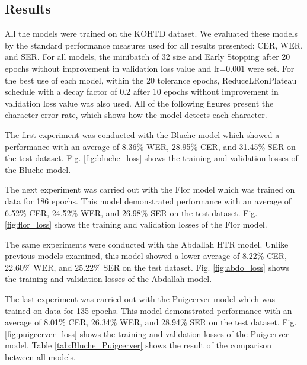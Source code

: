 \documentclass[preprint,12pt]{elsarticle}
\begin{document}
\subsection{Results}

All the models were trained on the KOHTD dataset. We evaluated these models by the standard performance measures used for all results presented: CER, WER, and SER. For all models, the minibatch of 32 size and Early Stopping after 20 epochs without improvement in validation loss value and lr=0.001 were set. For the best use of each model, within the 20 tolerance epochs, ReduceLRonPlateau schedule\cite{vinciarelli2001new} with a decay factor of 0.2 after 10 epochs without improvement in validation loss value was also used. All of the following figures present the character error rate, which shows how the model detects each character.

The first experiment was conducted with the Bluche model which showed a performance with an average of 8.36\% WER, 28.95\%  CER, and 31.45\% SER on the test dataset.  Fig. \ref{fig:bluche_loss} shows the training and validation losses of the Bluche model. 

The next experiment was carried out with the Flor model which was trained on data for 186 epochs. This model demonstrated performance with an average of 6.52\% CER, 24.52\%  WER, and 26.98\% SER on the test dataset. Fig. \ref{fig:flor_loss} shows the training and validation losses of the Flor model.

The same experiments were conducted with the Abdallah HTR model. Unlike previous models examined, this model showed a lower average of 8.22\% CER, 22.60\% WER, and 25.22\% SER on the test dataset. Fig. \ref{fig:abdo_loss} shows the training and validation losses of the Abdallah model.

The last experiment was carried out with the Puigcerver model which was trained on data for 135 epochs. This model demonstrated performance with an average of 8.01\% CER, 26.34\%  WER, and 28.94\% SER on the test dataset. Fig. \ref{fig:puigcerver_loss} shows the training and validation losses of the Puigcerver model. Table \ref{tab:Bluche_Puigcerver} shows the result of the comparison between all models.
\end{document}
